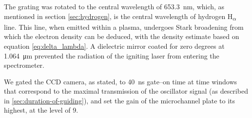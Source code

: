 \documentclass[../main.tex]{subfiles}
\begin{document}
The grating was rotated to the central wavelength of \SI{653.3}{\nm}, which, as mentioned in section \ref{sec:hydrogen}, is the central wavelength of hydrogen H\textsubscript{$\alpha$} line. This line, when emitted within a plasma, undergoes Stark broadening from which the electron density can be deduced, with the density estimate based on equation \ref{eq:delta_lambda}. A dielectric mirror coated for zero degrees at \SI{1.064}{\um} prevented the radiation of the igniting laser from entering the spectrometer.

We gated the CCD camera, as stated, to \SI{40}{\ns} gate--on time at time windows that correspond to the maximal transmission of the oscillator signal (as described in \ref{sec:duration-of-guiding}), and set the gain of the microchannel plate to its highest, at the level of 9.
\end{document}

